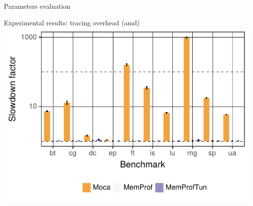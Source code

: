 \documentclass[xcolor={usenames,dvipsnames},hyperref={pdfusetitle}]{beamer}
\begin{document}
\begin{frame}{Parameters evaluation}
    \pause
\end{frame}


\begin{frame}{Experimental results: tracing overhead (amd)}
        \includegraphics[width=\linewidth]{moca/slides/moca_overhead_amd.pdf}
\end{frame}
\end{document}
